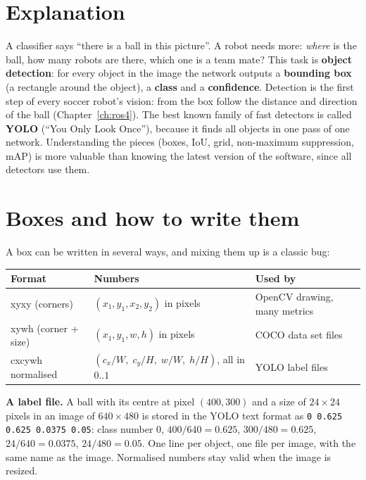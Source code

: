 \label{ch:ai4}

\section*{Explanation}
A classifier says ``there is a ball in this picture''. A robot needs more: \emph{where} is the ball, how many robots are there, which one is a team mate? This task is \textbf{object detection}: for every object in the image the network outputs a \textbf{bounding box} (a rectangle around the object), a \textbf{class} and a \textbf{confidence}. Detection is the first step of every soccer robot's vision: from the box follow the distance and direction of the ball (Chapter~\ref{ch:ros4}). The best known family of fast detectors is called \textbf{YOLO} (``You Only Look Once''), because it finds all objects in one pass of one network. Understanding the pieces (boxes, IoU, grid, non-maximum suppression, mAP) is more valuable than knowing the latest version of the software, since all detectors use them.

\section*{Boxes and how to write them}
A box can be written in several ways, and mixing them up is a classic bug:
\begin{center}
\renewcommand{\arraystretch}{1.25}
\begin{tabular}{p{2.6cm}p{5.2cm}p{4.6cm}}
\textbf{Format} & \textbf{Numbers} & \textbf{Used by}\\ \hline
xyxy (corners) & $(x_1,y_1,x_2,y_2)$ in pixels & OpenCV drawing, many metrics\\
xywh (corner + size) & $(x_1,y_1,w,h)$ in pixels & COCO data set files\\
cxcywh normalised & $(c_x/W,\;c_y/H,\;w/W,\;h/H)$, all in $0..1$ & YOLO label files\\
\end{tabular}
\end{center}
\begin{example}
\textbf{A label file.} A ball with its centre at pixel $(400,300)$ and a size of $24\times24$ pixels in an image of $640\times480$ is stored in the YOLO text format as \texttt{0 0.625 0.625 0.0375 0.05}: class number $0$, $400/640=0.625$, $300/480=0.625$, $24/640=0.0375$, $24/480=0.05$. One line per object, one file per image, with the same name as the image. Normalised numbers stay valid when the image is resized.
\end{example}


